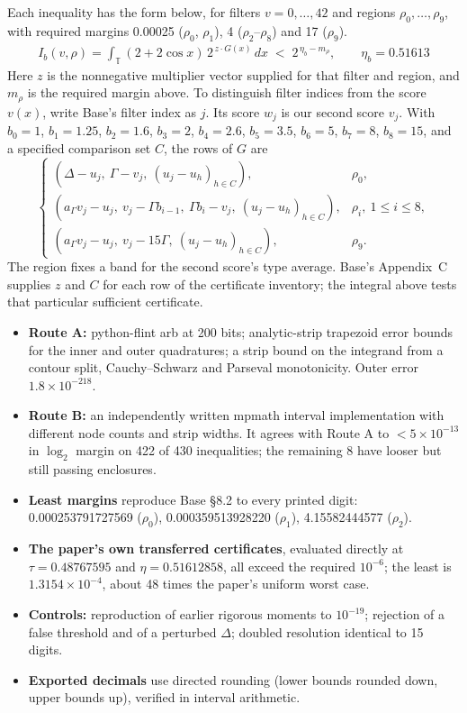 \documentclass[11pt]{article}
\theoremstyle{plain}
\begin{document}
Each inequality has the form below, for filters $v = 0,\dots,42$ and regions $\rho_0,\dots,\rho_9$, with required margins 0.00025 ($\rho_0$, $\rho_1$), 4 ($\rho_2$--$\rho_8$) and 17 ($\rho_9$).
\begin{gather*}
I_b(v,\rho) = \int_{\mathbb T} (2+2\cos x)\, 2^{\,z\cdot G(x)}\, dx \;<\; 2^{\,\eta_b - m_\rho}, \qquad \eta_b = 0.51613
\end{gather*}
Here $z$ is the nonnegative multiplier vector supplied for that filter and region, and $m_\rho$ is the required margin above. To distinguish filter indices from the score $v(x)$, write Base's filter index as $j$. Its score $w_j$ is our second score $v_j$. With $b_0=1$, $b_1=1.25$, $b_2=1.6$, $b_3=2$, $b_4=2.6$, $b_5=3.5$, $b_6=5$, $b_7=8$, $b_8=15$, and a specified comparison set $C$, the rows of $G$ are
\[
\begin{cases}
(\Delta-u_j,\ \Gamma-v_j,\ (u_j-u_h)_{h\in C}),&\rho_0,\\
(a_\Gamma v_j-u_j,\ v_j-\Gamma b_{i-1},\ \Gamma b_i-v_j,\ (u_j-u_h)_{h\in C}),&\rho_i,\ 1\le i\le8,\\
(a_\Gamma v_j-u_j,\ v_j-15\Gamma,\ (u_j-u_h)_{h\in C}),&\rho_9.
\end{cases}
\]
The region fixes a band for the second score's type average. Base's Appendix~C supplies $z$ and $C$ for each row of the certificate inventory; the integral above tests that particular sufficient certificate.


\begin{itemize}
\item \textbf{Route A:} python-flint arb at 200 bits; analytic-strip trapezoid error bounds~\cite[Thm.~3.2]{tw} for the inner and outer quadratures; a strip bound on the integrand from a contour split, Cauchy--Schwarz and Parseval monotonicity. Outer error $1.8\times10^{-218}$.
\item \textbf{Route B:} an independently written mpmath interval implementation with different node counts and strip widths. It agrees with Route A to $< 5\times10^{-13}$ in $\log_2$ margin on 422 of 430 inequalities; the remaining 8 have looser but still passing enclosures.
\item \textbf{Least margins} reproduce Base \S8.2 to every printed digit: 0.000253791727569 ($\rho_0$), 0.000359513928220 ($\rho_1$), 4.15582444577 ($\rho_2$).
\item \textbf{The paper's own transferred certificates}, evaluated directly at $\tau = 0.48767595$ and $\eta = 0.51612858$, all exceed the required $10^{-6}$; the least is $1.3154\times10^{-4}$, about 48 times the paper's uniform worst case.
\item \textbf{Controls:} reproduction of earlier rigorous moments to $10^{-19}$; rejection of a false threshold and of a perturbed $\Delta$; doubled resolution identical to 15 digits.
\item \textbf{Exported decimals} use directed rounding (lower bounds rounded down, upper bounds up), verified in interval arithmetic.
\end{itemize}
\end{document}
